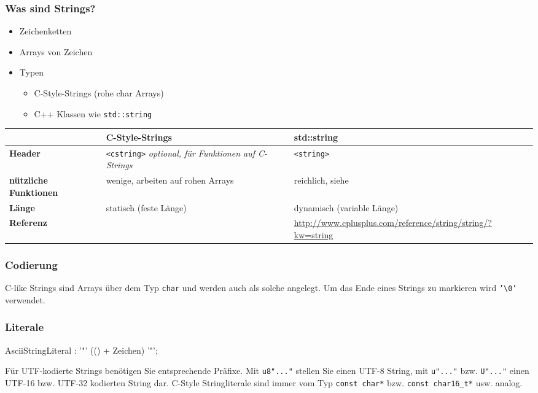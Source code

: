 \documentclass[a4paper]{report}
\begin{document}
\subsubsection{Was sind Strings?}
\begin{itemize}
	\item Zeichenketten
	\item Arrays von Zeichen
	\item Typen
	\begin{itemize}
		\item C-Style-Strings (rohe char Arrays)
		\item C++ Klassen wie \texttt{std::string}
	\end{itemize}
\end{itemize}

\begin{center}
	\begin{tabular}{|M{3cm}|M{6cm}|M{6cm}|} \hline
		&\textbf{C-Style-Strings} & \textbf{std::string} \\ \hline
		\textbf{Header} & \texttt{<cstring>} \textit{optional, für Funktionen auf C-Strings} & \texttt{<string>} \\ \hline
		\textbf{nützliche Funktionen} & wenige, arbeiten auf rohen Arrays & reichlich, siehe \\ \hline
		\textbf{Länge} & statisch (feste Länge) & dynamisch (variable Länge)\\ \hline
		\textbf{Referenz} & & \url{http://www.cplusplus.com/reference/string/string/?kw=string} \\ \hline
	\end{tabular}
\end{center}

\subsubsection{Codierung}
C-like Strings sind Arrays über dem Typ \texttt{char} und werden auch als solche angelegt. Um das Ende eines Strings zu markieren wird \texttt{'\textbackslash 0'} verwendet.

\subsubsection{Literale}

\begin{rail}
	AsciiStringLiteral : '"' (() + Zeichen) '"';
\end{rail}
Für UTF-kodierte Strings benötigen Sie entsprechende Präfixe. Mit \texttt{u8"..."} stellen Sie einen UTF-8 String, mit \texttt{u"..."} bzw. \texttt{U"..."} einen UTF-16 bzw. UTF-32 kodierten String dar. C-Style Stringliterale sind immer vom Typ \texttt{const char*} bzw. \texttt{const char16\_t*} usw. analog.
\end{document}
